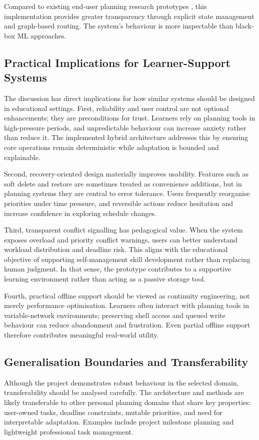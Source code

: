 \documentclass[12pt]{article}
\begin{document}
Compared to existing end-user planning research prototypes \parencite{lee2025veriplan}, this implementation provides greater transparency through explicit state management and graph-based routing. The system's behaviour is more inspectable than black-box ML approaches.

\subsection{Practical Implications for Learner-Support Systems}
The discussion has direct implications for how similar systems should be designed in educational settings. First, reliability and user control are not optional enhancements; they are preconditions for trust. Learners rely on planning tools in high-pressure periods, and unpredictable behaviour can increase anxiety rather than reduce it. The implemented hybrid architecture addresses this by ensuring core operations remain deterministic while adaptation is bounded and explainable.

Second, recovery-oriented design materially improves usability. Features such as soft delete and restore are sometimes treated as convenience additions, but in planning systems they are central to error tolerance. Users frequently reorganise priorities under time pressure, and reversible actions reduce hesitation and increase confidence in exploring schedule changes.

Third, transparent conflict signalling has pedagogical value. When the system exposes overload and priority conflict warnings, users can better understand workload distribution and deadline risk. This aligns with the educational objective of supporting self-management skill development rather than replacing human judgment. In that sense, the prototype contributes to a supportive learning environment rather than acting as a passive storage tool.

Fourth, practical offline support should be viewed as continuity engineering, not merely performance optimisation. Learners often interact with planning tools in variable-network environments; preserving shell access and queued write behaviour can reduce abandonment and frustration. Even partial offline support therefore contributes meaningful real-world utility.

\subsection{Generalisation Boundaries and Transferability}
Although the project demonstrates robust behaviour in the selected domain, transferability should be analysed carefully. The architecture and methods are likely transferable to other personal planning domains that share key properties: user-owned tasks, deadline constraints, mutable priorities, and need for interpretable adaptation. Examples include project milestone planning and lightweight professional task management.
\end{document}
